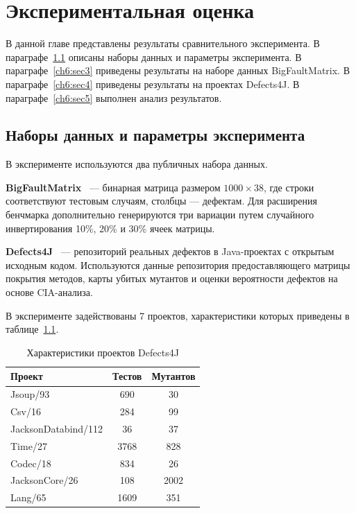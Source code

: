 \chapter{Экспериментальная оценка} \label{ch6}

В данной главе представлены результаты сравнительного эксперимента. 
В параграфе~\ref{ch6:sec1} описаны наборы данных и параметры эксперимента. 
В параграфе~\ref{ch6:sec3} приведены результаты на наборе данных BigFaultMatrix. 
В параграфе~\ref{ch6:sec4} приведены результаты на проектах Defects4J. 
В параграфе~\ref{ch6:sec5} выполнен анализ результатов.

\section{Наборы данных и параметры эксперимента} \label{ch6:sec1}

В эксперименте используются два публичных набора данных.

\textbf{BigFaultMatrix}~\cite{paygude2020} --- бинарная матрица размером $1000 \times 38$, 
где строки соответствуют тестовым случаям, столбцы --- дефектам. Для расширения бенчмарка 
дополнительно генерируются три вариации путем случайного инвертирования 10\%, 20\% и 30\% ячеек матрицы.

\textbf{Defects4J}~\cite{mahdieh2021} --- репозиторий реальных 
дефектов в Java-проектах с открытым исходным кодом. Используются данные репозитория предоставляющего 
матрицы покрытия методов, карты убитых мутантов и оценки вероятности дефектов на основе CIA-анализа.

В эксперименте задействованы 7 проектов, характеристики которых приведены в таблице~\ref{tab:datasets}.

\begin{table}[h]
\caption{Характеристики проектов Defects4J}
\label{tab:datasets}
\begin{tabularx}{\textwidth}{|X|c|c|}
\hline
Проект & Тестов & Мутантов \\
\hline
Jsoup/93            & 690  & 30   \\
Csv/16              & 284  & 99   \\
JacksonDatabind/112 & 36   & 37   \\
Time/27             & 3768 & 828  \\
Codec/18            & 834  & 26   \\
JacksonCore/26      & 108  & 2002 \\
Lang/65             & 1609 & 351  \\
\hline
\end{tabularx}
\end{table}

